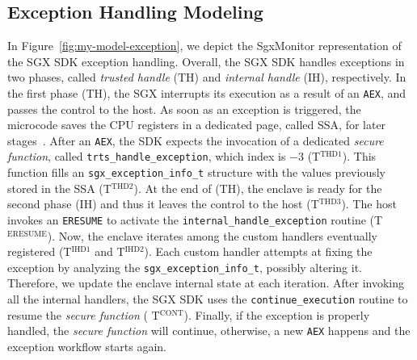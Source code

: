 \subsection{Exception Handling Modeling}
\label{ssec:exception-handling}

In Figure~\ref{fig:my-model-exception}, we depict the SgxMonitor 
representation 
of the SGX SDK exception handling.
Overall, the SGX SDK handles exceptions in two phases, called \emph{trusted 
handle} (TH) and \emph{internal handle} (IH), respectively.
In the first phase (TH), the SGX interrupts its 
execution as a result of an \texttt{AEX}, and passes the control to the host.
As soon as an exception is triggered, the microcode saves the CPU
registers in a dedicated page, called SSA, for later 
stages~\cite{costan2016intel}.
After an \texttt{AEX}, the SDK expects the invocation of a dedicated 
\emph{secure function}, called \texttt{trts\_handle\_exception}, which index is 
$-3$ (\ie T$^\text{THD1}$).
This function fills an \texttt{sgx\_exception\_info\_t} structure with the 
values previously stored in the SSA (\ie T$^\text{THD2}$).
At the end of (TH), the enclave is ready for the second phase (IH) and thus it
leaves the control to the host (\ie T$^\text{THD3}$).
The host invokes an \texttt{ERESUME} to activate
the \texttt{internal\_handle\_exception} routine (\ie T$^\text{ERESUME}$).
Now, the enclave iterates among the custom handlers eventually registered
(\ie T$^\text{IHD1}$ and T$^\text{IHD2}$).
Each custom handler attempts at fixing the exception by analyzing the 
\texttt{sgx\_exception\_info\_t}, possibly altering it.
Therefore, we update the enclave internal state at each iteration.
After invoking all the internal handlers, the SGX SDK uses the
\texttt{continue\_execution} routine to resume the \emph{secure function} (\ie 
T$^\text{CONT}$).
Finally, if the exception is properly handled, the \emph{secure function} 
will continue, otherwise, a new \texttt{AEX} happens and the 
exception workflow starts again.

